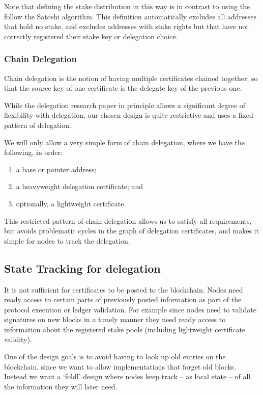 \documentclass[11pt,a4paper]{article}
\begin{document}
Note that defining the stake distribution in this way is in contrast to
using the follow the Satoshi algorithm. This definition automatically
excludes all addresses that hold no stake, and excludes addresses with
stake rights but that have not correctly registered their stake key or
delegation choice.

\subsubsection{Chain Delegation}\label{chain-delegation}

Chain delegation is the notion of having multiple certificates chained
together, so that the source key of one certificate is the delegate key
of the previous one.

While the delegation research paper in principle allows a significant
degree of flexibility with delegation, our chosen design is quite
restrictive and uses a fixed pattern of delegation.

We will only allow a very simple form of chain delegation, where we have
the following, in order:

\begin{enumerate}
\def\labelenumi{\arabic{enumi}.}
\item
  a base or pointer address;
\item
  a heavyweight delegation certificate; and
\item
  optionally, a lightweight certificate.
\end{enumerate}

This restricted pattern of chain delegation allows us to satisfy all
requirements, but avoids problematic cycles in the graph of delegation
certificates, and makes it simple for nodes to track the delegation.

\subsection{State Tracking for
delegation}\label{state-tracking-for-delegation}

It is not sufficient for certificates to be posted to the blockchain.
Nodes need ready access to certain parts of previously posted
information as part of the protocol execution or ledger validation. For
example since nodes need to validate signatures on new blocks in a
timely manner they need ready access to information about the registered
stake pools (including lightweight certificate validity).

One of the design goals is to avoid having to look up old entries on the
blockchain, since we want to allow implementations that forget old
blocks. Instead we want a `foldl' design where nodes keep track -- as
local state -- of all the information they will later need.
\end{document}
